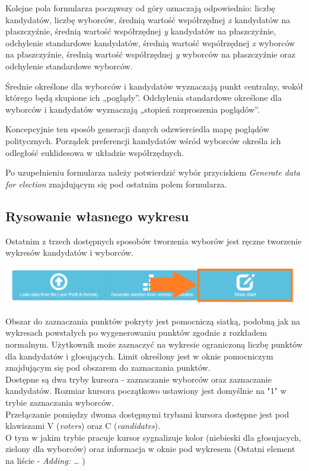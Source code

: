 \documentclass[pdflatex,11pt]{../aghdoc_version2}
\begin{document}
\vspace{\baselineskip}
Kolejne pola formularza począwszy od góry oznaczają odpowiednio: liczbę kandydatów, liczbę wyborców, średnią wartość współrzędnej \textit{x} kandydatów na płaszczyźnie, średnią wartość współrzędnej \textit{y} kandydatów na płaszczyźnie, odchylenie standardowe kandydatów, średnią wartość współrzędnej \textit{x} wyborców na płaszczyźnie, średnią wartość współrzędnej \textit{y} wyborców na płaszczyźnie oraz odchylenie standardowe wyborców.

Średnie określone dla wyborców i kandydatów wyznaczają punkt centralny, wokół którego będą skupione ich „poglądy”.  Odchylenia standardowe określone dla wyborców i kandydatów wyznaczają „stopień rozproszenia poglądów”.

Koncepcyjnie ten sposób generacji danych odzwierciedla mapę poglądów politycznych. Porządek preferencji kandydatów wśród wyborców określa ich odległość euklidesowa w układzie współrzędnych.

Po uzupełnieniu formularza należy potwierdzić wybór przyciskiem \textit{Generate data for election} znajdującym się pod ostatnim polem formularza.

\newpage
\subsection{Rysowanie własnego wykresu}
\label{subsec:wlasnywykres}
Ostatnim z trzech dostępnych sposobów tworzenia wyborów jest ręczne tworzenie wykresów kandydatów i wyborców.

\begin{center}
\includegraphics[width=1.0\textwidth]{pics/paint_election_button.png}
\end{center}
Obszar do zaznaczania punktów pokryty jest pomocniczą siatką, podobną jak na wykresach powstałych po
wygenerowaniu punktów zgodnie z rozkładem normalnym. Użytkownik może zaznaczyć na wykresie ograniczoną 
liczbę punktów dla kandydatów i głosujących. Limit określony jest w oknie pomocniczym znajdującym się 
pod obszarem do zaznaczania punktów.\\
Dostępne są dwa tryby kursora - zaznaczanie wyborców oraz zaznaczanie kandydatów. Rozmiar kursora 
początkowo ustawiony jest domyślnie na "1" w trybie zaznaczania wyborców.\\
Przełączanie pomiędzy dwoma dostępnymi trybami kursora dostępne jest pod klawiszami V (\textit{voters}) oraz C (\textit{candidates}).\\
O tym w jakim trybie pracuje kursor sygnalizuje kolor (niebieski dla głosujacych, zielony dla wyborców) oraz informacja w oknie pod wykresem (Ostatni element na liście - \textit{Adding: \ldots} )
\end{document}
